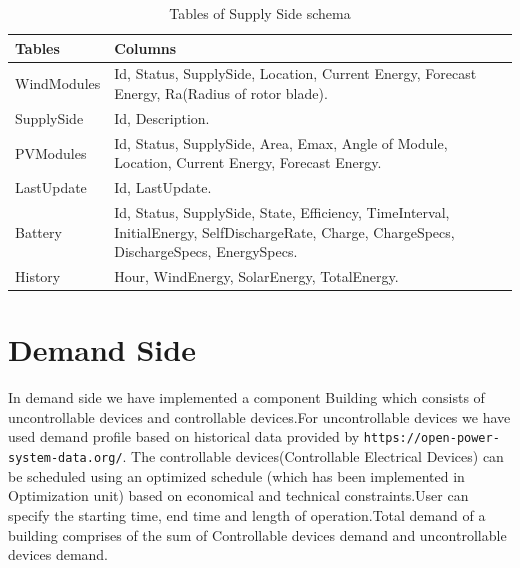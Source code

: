\documentclass[runningheads]{llncs}
\begin{document}
\begin{table}[H]
\centering
\caption{Tables of Supply Side schema}\label{tab2}
\begin{tabular}{|p{3 cm}|p{8.5 cm}|}
\hline
\textbf{Tables} & \textbf{Columns} \\
\hline
WindModules & Id, Status, SupplySide, Location, Current Energy, Forecast Energy, Ra(Radius of rotor blade).\\
\hline
SupplySide &Id, Description.\\
\hline
PVModules & Id, Status, SupplySide, Area, Emax, Angle of Module, Location, Current Energy, Forecast Energy.\\
\hline
LastUpdate & Id, LastUpdate.\\
\hline
Battery & Id, Status, SupplySide, State, Efficiency, TimeInterval, InitialEnergy, SelfDischargeRate, Charge, ChargeSpecs, DischargeSpecs, EnergySpecs.\\
\hline
History & Hour, WindEnergy, SolarEnergy, TotalEnergy.\\
\hline
\end{tabular}
\end{table}

\section{Demand Side}
In demand side we have implemented a component Building which consists of  uncontrollable devices and controllable devices.For uncontrollable devices we have used demand profile based on historical data provided by \texttt{https://open-power-system-data.org/}.
The controllable devices(Controllable Electrical Devices) can be scheduled using an  optimized schedule (which has been implemented  in Optimization unit) based on economical and technical constraints.User can specify the starting time, end time and length of operation.Total demand of a building comprises of the sum of Controllable devices demand and uncontrollable devices demand.\\ 
\end{document}
